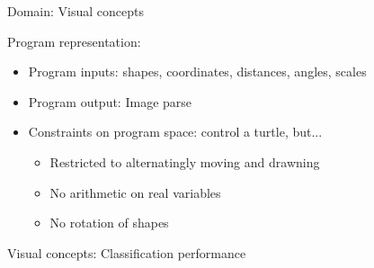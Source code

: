 \documentclass[final]{beamer}
\newlength{\onecolwid}
\newlength{\twocolwid}
\begin{document}
\begin{frame}[t]
\begin{columns}[t]
\begin{column}{\twocolwid}
\begin{columns}[t,totalwidth=\twocolwid]
\begin{column}{\onecolwid}
\begin{block}{Domain: Visual concepts}
    \vspace{0.5cm}

    Program representation:
    \begin{itemize}
    \item Program inputs: shapes, coordinates, distances, angles, scales
      \item Program output: Image parse
      \item Constraints on program space: control a turtle, but...
        \begin{itemize}
        \item Restricted to alternatingly moving and drawning
        \item No arithmetic on real variables
        \item No rotation of shapes
        \end{itemize}
        
      \end{itemize}

    
    \end{block}

\begin{block}{Visual concepts: Classification performance}


\end{block}
\end{column}
\end{columns}
\end{column}
\end{columns}
\end{frame}
\end{document}
